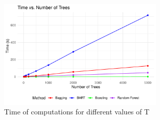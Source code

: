 \documentclass[a4paper,11pt]{article}
\begin{document}
\begin{figure}
  \centering
  \includegraphics[width=0.7\textwidth]{../outputs/time_plot.pdf}
  \caption{Time of computations for different values of T}
  \label{plot_time}
\end{figure}

\printbibliography
\end{document}
